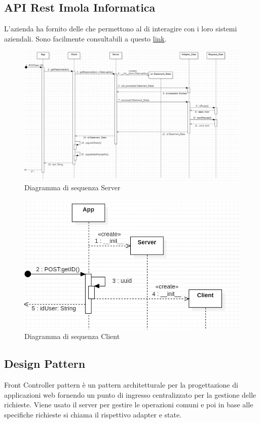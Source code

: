 \subsection{API Rest Imola Informatica} L'azienda ha fornito delle  che permettono al  di interagire con i loro sistemi aziendali. Sono facilmente consultabili a questo \href{https://apibot4me.imolinfo.it/}{\color{blue} link}.
\newpage
\begin{landscape}
	\begin{figure}[H]
	\centering\includegraphics[width=\linewidth]{images/diagramma_sequenza_server.jpg}
    \caption{Diagramma di sequenza Server}
	\end{figure}
\end{landscape}
\begin{figure}[H]
    \centering\includegraphics[width=\linewidth]{images/diagramma_sequenza_client.jpg}
    \caption{Diagramma di sequenza Client}
\end{figure}
\subsection{Design Pattern}
Front Controller pattern è un pattern architetturale per la progettazione di applicazioni web fornendo un punto di ingresso centralizzato per la gestione delle richieste.
Viene usato il server per gestire le operazioni comuni e poi in base alle specifiche richieste si chiama il rispettivo adapter e state.
\newpage
